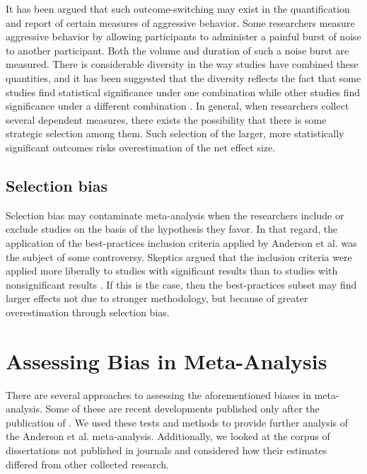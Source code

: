 \documentclass[man, mask]{apa6}
\begin{document}
It has been argued that such outcome-switching may exist in the quantification and report of certain measures of aggressive behavior. Some researchers measure aggressive behavior by allowing participants to administer a painful burst of noise to another participant. Both the volume and duration of such a noise burst are measured.  There is considerable diversity in the way studies have combined these quantities, and it has been suggested that the diversity reflects the fact that some studies find statistical significance under one combination while other studies find significance under a different combination \citep{Elson:etal:2014}.  In general, when researchers collect several dependent measures, there exists the possibility that there is some strategic selection among them. Such selection of the larger, more statistically significant outcomes risks overestimation of the net effect size. 

\subsection{Selection bias}
Selection bias may contaminate meta-analysis when the researchers include or exclude studies on the basis of the hypothesis they favor. In that regard, the application of the best-practices inclusion criteria applied by Anderson et al. was the subject of some controversy. Skeptics argued that the inclusion criteria were applied more liberally to studies with significant results than to studies with nonsignificant results \citep{Ferguson:2010}. If this is the case, then the best-practices subset may find larger effects not due to stronger methodology, but because of greater overestimation through selection bias. 

\section{Assessing Bias in Meta-Analysis}
There are several approaches to assessing the aforementioned biases in meta-analysis. Some of these are recent developments published only after the publication of \citet{Anderson:etal:2010}. We used these tests and methods to provide further analysis of the Anderson et al. meta-analysis. Additionally, we looked at the corpus of dissertations not published in journals and considered how their estimates differed from other collected research.
\end{document}

